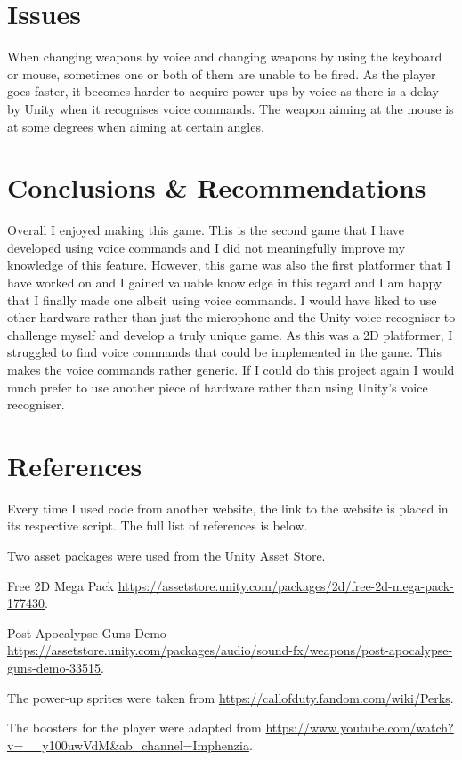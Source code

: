 \documentclass{article}
\begin{document}
\section{Issues}
When changing weapons by voice and changing weapons by using the keyboard or mouse, sometimes one or both of them are unable to be fired. As the player goes faster, it becomes harder to acquire power-ups by voice as there is a delay by Unity when it recognises voice commands. The weapon aiming at the mouse is at some degrees when aiming at certain angles.

\section{Conclusions \& Recommendations}
Overall I enjoyed making this game. This is the second game that I have developed using voice commands and I did not meaningfully improve my knowledge of this feature. However, this game was also the first platformer that I have worked on and I gained valuable knowledge in this regard and I am happy that I finally made one albeit using voice commands. I would have liked to use other hardware rather than just the microphone and the Unity voice recogniser to challenge myself and develop a truly unique game. As this was a 2D platformer, I struggled to find voice commands that could be implemented in the game. This makes the voice commands rather generic. If I could do this project again I would much prefer to use another piece of hardware rather than using Unity's voice recogniser.

\section{References}
Every time I used code from another website, the link to the website is placed in its respective script. The full list of references is below.

Two asset packages were used from the Unity Asset Store.

Free 2D Mega Pack
\url{https://assetstore.unity.com/packages/2d/free-2d-mega-pack-177430}.

Post Apocalypse Guns Demo \url{https://assetstore.unity.com/packages/audio/sound-fx/weapons/post-apocalypse-guns-demo-33515}.

The power-up sprites were taken from \url{https://callofduty.fandom.com/wiki/Perks}.

The boosters for the player were adapted from \url{https://www.youtube.com/watch?v=__y100uwVdM&ab_channel=Imphenzia}.
\end{document}

